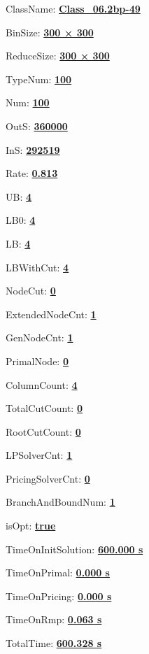 \documentclass[11pt]{article}
\begin{document}
\pagestyle{empty}


ClassName: \underline{\textbf{Class_06.2bp-49}}
\par
BinSize: \underline{\textbf{300 × 300}}
\par
ReduceSize: \underline{\textbf{300 × 300}}
\par
TypeNum: \underline{\textbf{100}}
\par
Num: \underline{\textbf{100}}
\par
OutS: \underline{\textbf{360000}}
\par
InS: \underline{\textbf{292519}}
\par
Rate: \underline{\textbf{0.813}}
\par
UB: \underline{\textbf{4}}
\par
LB0: \underline{\textbf{4}}
\par
LB: \underline{\textbf{4}}
\par
LBWithCut: \underline{\textbf{4}}
\par
NodeCut: \underline{\textbf{0}}
\par
ExtendedNodeCnt: \underline{\textbf{1}}
\par
GenNodeCnt: \underline{\textbf{1}}
\par
PrimalNode: \underline{\textbf{0}}
\par
ColumnCount: \underline{\textbf{4}}
\par
TotalCutCount: \underline{\textbf{0}}
\par
RootCutCount: \underline{\textbf{0}}
\par
LPSolverCnt: \underline{\textbf{1}}
\par
PricingSolverCnt: \underline{\textbf{0}}
\par
BranchAndBoundNum: \underline{\textbf{1}}
\par
isOpt: \underline{\textbf{true}}
\par
TimeOnInitSolution: \underline{\textbf{600.000 s}}
\par
TimeOnPrimal: \underline{\textbf{0.000 s}}
\par
TimeOnPricing: \underline{\textbf{0.000 s}}
\par
TimeOnRmp: \underline{\textbf{0.063 s}}
\par
TotalTime: \underline{\textbf{600.328 s}}
\par
\newpage
\end{document}

